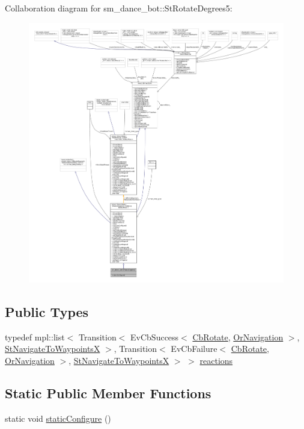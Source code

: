 Collaboration diagram for sm\+\_\+dance\+\_\+bot\+:\+:St\+Rotate\+Degrees5\+:
\nopagebreak
\begin{figure}[H]
\begin{center}
\leavevmode
\includegraphics[width=350pt]{structsm__dance__bot_1_1StRotateDegrees5__coll__graph}
\end{center}
\end{figure}
\subsection*{Public Types}
\begin{DoxyCompactItemize}
\item 
typedef mpl\+::list$<$ Transition$<$ Ev\+Cb\+Success$<$ \hyperlink{classcl__move__base__z_1_1CbRotate}{Cb\+Rotate}, \hyperlink{classsm__dance__bot_1_1OrNavigation}{Or\+Navigation} $>$, \hyperlink{structsm__dance__bot_1_1StNavigateToWaypointsX}{St\+Navigate\+To\+WaypointsX} $>$, Transition$<$ Ev\+Cb\+Failure$<$ \hyperlink{classcl__move__base__z_1_1CbRotate}{Cb\+Rotate}, \hyperlink{classsm__dance__bot_1_1OrNavigation}{Or\+Navigation} $>$, \hyperlink{structsm__dance__bot_1_1StNavigateToWaypointsX}{St\+Navigate\+To\+WaypointsX} $>$ $>$ \hyperlink{structsm__dance__bot_1_1StRotateDegrees5_aa7b7dab27b4534c1ce16ad339d4a148e}{reactions}
\end{DoxyCompactItemize}
\subsection*{Static Public Member Functions}
\begin{DoxyCompactItemize}
\item 
static void \hyperlink{structsm__dance__bot_1_1StRotateDegrees5_a60fd6ec21fe69a27245785e83b610b57}{static\+Configure} ()
\end{DoxyCompactItemize}
